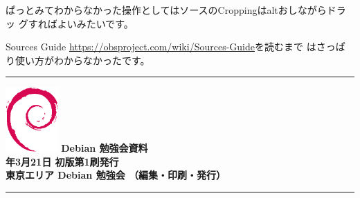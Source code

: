 \documentclass[mingoth,a4paper]{jsarticle}
\newcommand{\debmtgyear}{2020}
\newcommand{\debmtgmonth}{3}
\newcommand{\debmtgdate}{21}
\begin{document}
ぱっとみてわからなかった操作としてはソースのCroppingはaltおしながらドラッ
グすればよいみたいです。

Sources Guide \url{https://obsproject.com/wiki/Sources-Guide}を読むまで
はさっぱり使い方がわからなかったです。

\mbox{}\newpage

\vspace*{15cm}
\hrule
\vspace{2mm}
\includegraphics[width=2cm]{image200502/openlogo-nd.eps}
\noindent \Large \bf Debian 勉強会資料\\
\noindent \normalfont \debmtgyear{}年\debmtgmonth{}月\debmtgdate{}日 \hspace{5mm}  初版第1刷発行\\
\noindent \normalfont 東京エリア Debian 勉強会 （編集・印刷・発行）\\
\hrule
\end{document}
